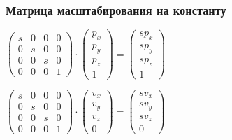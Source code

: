 \documentclass[10pt]{beamer}
\begin{document}
\begin{frame}[fragile]
\frametitle{Матрица масштабирования на константу}
\begin{center}
\begin{math}
\begin{pmatrix}
s & 0 & 0 & 0 \\
0 & s & 0 & 0 \\
0 & 0 & s & 0 \\
0 & 0 & 0 & 1
\end{pmatrix}
\cdot
\begin{pmatrix}
p_x \\
p_y \\
p_z \\
1
\end{pmatrix}
=
\begin{pmatrix}
s p_x\\
s p_y\\
s p_z\\
1
\end{pmatrix}
\end{math}

\begin{math}
\begin{pmatrix}
s & 0 & 0 & 0 \\
0 & s & 0 & 0 \\
0 & 0 & s & 0 \\
0 & 0 & 0 & 1
\end{pmatrix}
\cdot
\begin{pmatrix}
v_x \\
v_y \\
v_z \\
0
\end{pmatrix}
=
\begin{pmatrix}
s v_x\\
s v_y\\
s v_z\\
0
\end{pmatrix}
\end{math}
\end{center}
\end{frame}
\end{document}
